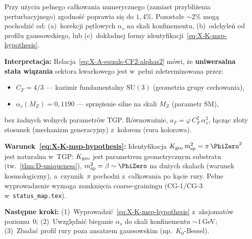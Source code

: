 \begin{proposition}[Skasowanie $\PhiZero$
  i~relacja $\mathcal{A} = C_F^2\,\alpha_s^2$ (v47b)]
\noindent
Przy u\.zyciu pe\l{}nego ca\l{}kowania numerycznego (zamiast przybli\.zenia
perturbacyjnego) zgodno\'s\'c poprawia si\k{e} do $1{,}4\%$.
Pozosta\l{}e $\sim\!2\%$ mog\k{a} pochodzi\'c od:
(a)~korekcji p\k{e}tlowych $\alpha_s$ na skali konfinementu,
(b)~odchyle\'n od profilu gaussowskiego,
lub (c)~dok\l{}adnej formy identyfikacji~\eqref{eq:X-K-msp-hypothesis}.

\medskip\noindent
\textbf{Interpretacja:}
Relacja~\eqref{eq:X-A-equals-CF2-alphas2} m\'owi, \.ze
\textbf{uniwersalna sta\l{}a wi\k{a}zania} sektora kwarkowego jest
w~pe\l{}ni zdeterminowana przez:
\begin{itemize}[nosep]
  \item $C_F = 4/3$ --- kazimir fundamentalny $\mathrm{SU}(3)$
    (geometria grupy cechowania),
  \item $\alpha_s(M_Z) = 0{,}1190$ --- sprz\k{e}\.zenie silne
    na skali $M_Z$ (parametr SM),
\end{itemize}
bez \.zadnych wolnych parametr\'ow TGP.
R\'ownowa\.znie, $a_\Gamma = \varphi\,C_F^2\,\alpha_s^2$, \l{}\k{a}cz\k{a}c
z\l{}oty stosunek (mechanizm generacyjny) z~kolorem (rura kolorowa).

\medskip\noindent
\textbf{Warunek~\eqref{eq:X-K-msp-hypothesis}:}
Identyfikacja $K_{\rm geo}\,m_{\rm sp}^2 = \pi\,\PhiZero^2$ jest
naturalna w~TGP: $K_{\rm geo}$ jest parametrem geometrycznym substratu
(tw.~\ref{thm:D-uniqueness}), $m_{\rm sp}^2 = \beta \sim \PhiZero$ na du\.zych
skalach (warunek kosmologiczny), a~czynnik~$\pi$ pochodzi
z~ca\l{}kowania po k\k{a}cie rury.
Pe\l{}ne wyprowadzenie wymaga zamkni\k{e}cia coarse-grainingu
(CG-1/CG-3 w~\texttt{status\_map.tex}).

\medskip\noindent
\textbf{Nast\k{e}pne kroki:}
(1)~Wyprowadzi\'c~\eqref{eq:X-K-msp-hypothesis}
z~aksjomat\'ow poziomu~0;
(2)~Uwzgl\k{e}dni\'c bieganie $\alpha_s$ do skali konfinementu
$\sim 1$\,GeV;
(3)~Zbada\'c profil rury poza ansatzem gaussowskim (np.\ $K_0$-Bessel).
\end{proposition}

